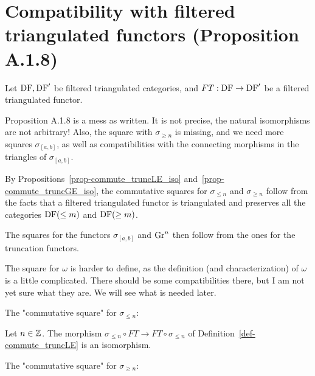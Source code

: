 \section{Compatibility with filtered triangulated functors (Proposition A.1.8)}

Let $\operatorname{DF},\operatorname{DF}'$ be filtered triangulated categories, and $FT:\operatorname{DF}\to\operatorname{DF}'$ be a filtered 
triangulated functor.

Proposition A.1.8 is a mess as written.
It is not precise, the natural isomorphisms are not arbitrary!
Also, the square with $\sigma_{\ge n}$ is missing, and we need more squares
$\sigma_{[a,b]}$, as well as compatibilities with the connecting
morphisms in the triangles of $\sigma_{[a,b]}$.

By Propositions~\ref{prop-commute_truncLE_iso} and~\ref{prop-commute_truncGE_iso},
the commutative squares for $\sigma_{\le n}$ and
$\sigma_{\ge n}$ follow from the facts that a filtered triangulated functor is triangulated 
and preserves all the categories $\operatorname{DF}(\le m)$ and $\operatorname{DF}(\ge m)$.

The squares for the functors $\sigma_{[a,b]}$ and $\operatorname{Gr}^n$ then follow from the ones for
the truncation functors.

The square for $\omega$ is harder to define, as the definition (and characterization) 
of $\omega$ is a little complicated. There should be some compatibilities there, but I am 
not yet sure what they are. We will see what is needed later.

The "commutative square" for $\sigma_{\le n}$: 

\begin{proposition}
\label{prop-FT-truncLE}

Let $n\in\mathbb{Z}$. The morphism $\sigma_{\le n}\circ FT \to FT\circ\sigma_{\le n}$
of Definition~\ref{def-commute_truncLE} is an isomorphism.

\end{proposition}

The "commutative square" for $\sigma_{\ge n}$: 

